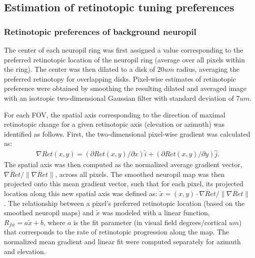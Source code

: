 \subsection{Estimation of retinotopic tuning preferences}
\subsubsection{Retinotopic preferences of background neuropil}
The center of each neuropil ring was first assigned a value corresponding to the preferred retinotopic location of the neuropil ring (average over all pixels within the ring). The center was then dilated to a disk of 20$um$ radius, averaging the preferred retinotopy for overlapping disks. Pixel-wise estimates of retinotopic preference were obtained by smoothing the resulting dilated and averaged image with an isotropic two-dimensional Gaussian filter with standard deviation of 7$um$. 

For each FOV, the spatial axis corresponding to the direction of maximal retinotopic change for a given retinotopic axis (elevation or azimuth) was identified as follows\cite{Liang2018}. First, the two-dimensional pixel-wise gradient was calculated as:  
\begin{align}
\nabla Ret(x, y) = (\partial Ret(x, y)/\partial x)\hat{i} + (\partial Ret(x, y)/\partial y)\hat{j}.
\end{align}
The spatial axis was then computed as the normalized average gradient vector, $\overline{\nabla Ret}/ \|\overline{\nabla Ret}\|$, across all pixels. The smoothed neuropil map was then projected onto this mean gradient vector, such that for each pixel, its projected location along this new spatial axis was defined as:  $\tilde{x}=(x, y)\cdot \overline{\nabla Ret}/ \|\overline{\nabla Ret}\|$. The relationship between a pixel's preferred retinotopic location (based on the smoothed neuropil maps) and $\tilde{x}$ was modeled with a linear function, $R_{fit}=a\tilde{x}+b$, where $a$ is the fit parameter (in visual field degrees/cortical $um$) that corresponds to the rate of retinotopic progression along the map. The normalized mean gradient and linear fit were computed separately for azimuth and elevation.

